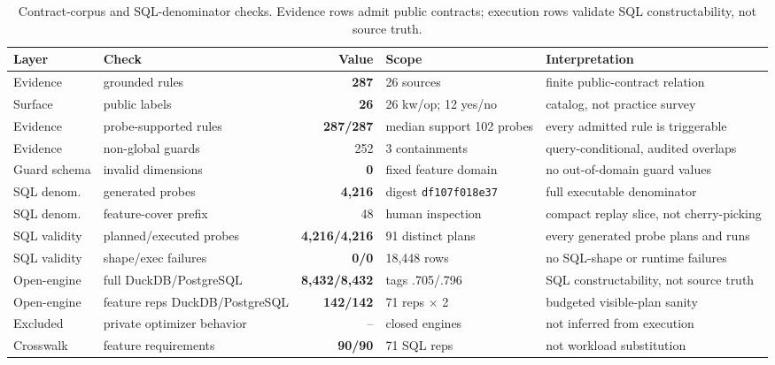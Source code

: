 \begin{table}[t]
\centering
\caption{Contract-corpus and SQL-denominator checks. Evidence rows admit public contracts; execution rows validate SQL constructability, not source truth.}
\label{tab:denominator-dashboard}
\footnotesize
\setlength{\tabcolsep}{4pt}
\begin{tabular}{@{}llrll@{}}
\toprule
Layer & Check & Value & Scope & Interpretation \\
\midrule
Evidence & grounded rules & \textbf{287} & 26 sources & finite public-contract relation \\
Surface & public labels & \textbf{26} & 26 kw/op; 12 yes/no & catalog, not practice survey \\
Evidence & probe-supported rules & \textbf{287/287} & median support 102 probes & every admitted rule is triggerable \\
Evidence & non-global guards & 252 & 3 containments & query-conditional, audited overlaps \\
Guard schema & invalid dimensions & \textbf{0} & fixed feature domain & no out-of-domain guard values \\
SQL denom. & generated probes & \textbf{4,216} & digest \texttt{df107f018e37} & full executable denominator \\
SQL denom. & feature-cover prefix & 48 & human inspection & compact replay slice, not cherry-picking \\
SQL validity & planned/executed probes & \textbf{4,216/4,216} & 91 distinct plans & every generated probe plans and runs \\
SQL validity & shape/exec failures & \textbf{0/0} & 18,448 rows & no SQL-shape or runtime failures \\
Open-engine & full DuckDB/PostgreSQL & \textbf{8,432/8,432} & tags .705/.796 & SQL constructability, not source truth \\
Open-engine & feature reps DuckDB/PostgreSQL & \textbf{142/142} & 71 reps $\times$ 2 & budgeted visible-plan sanity \\
Excluded & private optimizer behavior & -- & closed engines & not inferred from execution \\
Crosswalk & feature requirements & \textbf{90/90} & 71 SQL reps & not workload substitution \\
\bottomrule
\end{tabular}
\end{table}
